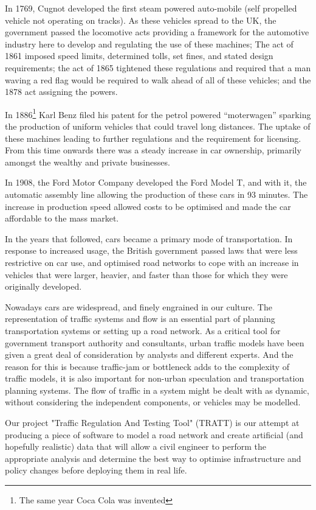 In 1769, Cugnot developed the first steam powered auto-mobile \cite{eckermann2001world} (self propelled vehicle not operating on tracks). As these vehicles spread to the UK, the government passed the locomotive acts providing a framework for the automotive industry here to develop and regulating the use of these machines; The act of 1861 imposed speed limits, determined tolls, set fines, and stated design requirements; the act of 1865 tightened these regulations and required that a man waving a red flag would be required to walk ahead of all of these vehicles; and the 1878 act assigning the powers.
	
	In 1886\footnote{The same year Coca Cola was invented} Karl Benz filed his patent for the petrol powered ``moterwagen'' \cite{benzpatent} sparking the production of uniform vehicles that could travel long distances. The uptake of these machines leading to further regulations and the requirement for licensing. From this time onwards there was a steady increase in car ownership, primarily amongst the wealthy and private businesses.

	In 1908, the Ford Motor Company developed the Ford Model T, and with it, the automatic assembly line allowing the production of these cars in 93 minutes. The increase in production speed allowed costs to be optimised and made the car affordable to the mass market.
	
	In the years that followed, cars became a primary mode of transportation. In response to increased usage, the British government passed laws that were less restrictive on car use, and optimised road networks to cope with an increase in vehicles that were larger, heavier, and faster than those for which they were originally developed.
	
	Nowadays cars are widespread, and finely engrained in our culture\cite{miller2001car}\cite{berdahl2000go}. The representation of traffic systems and flow is an essential part of planning transportation systems or setting up a road network. As a critical tool for government transport authority and consultants, urban traffic models have been given a great deal of consideration by analysts and different experts. And the reason for this is because traffic-jam or bottleneck adds to the complexity of traffic models, it is also important for non-urban speculation and transportation planning systems. The flow of traffic in a system might be dealt with as dynamic, without considering the independent components, or vehicles may be modelled. 
	
	Our project "Traffic  Regulation And Testing Tool" (TRATT) is our attempt at producing a piece of software to model a road network and create artificial (and hopefully realistic) data that will allow a civil engineer to perform the appropriate analysis and determine the best way to optimise infrastructure and policy changes before deploying them in real life.
